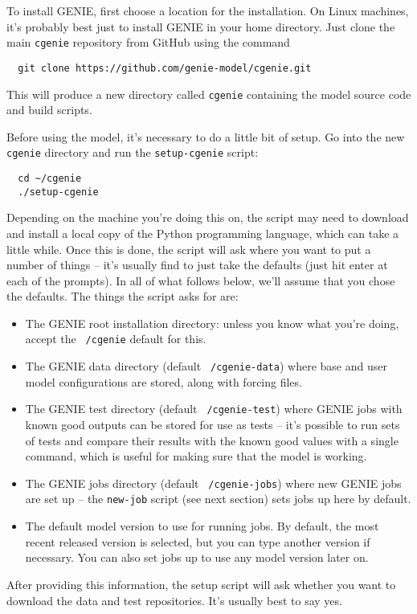 \documentclass[a4paper,10pt,article]{memoir}
\begin{document}
To install GENIE, first choose a location for the installation.  On
Linux machines, it's probably best just to install GENIE in your home
directory.  Just clone the main \texttt{cgenie} repository from GitHub
using the command
\begin{verbatim}
  git clone https://github.com/genie-model/cgenie.git
\end{verbatim}
This will produce a new directory called \texttt{cgenie} containing
the model source code and build scripts.

Before using the model, it's necessary to do a little bit of setup.
Go into the new \texttt{cgenie} directory and run the
\texttt{setup-cgenie} script:
\begin{verbatim}
  cd ~/cgenie
  ./setup-cgenie
\end{verbatim}
Depending on the machine you're doing this on, the script may need to
download and install a local copy of the Python programming language,
which can take a little while.  Once this is done, the script will ask
where you want to put a number of things -- it's usually find to just
take the defaults (just hit enter at each of the prompts).  In all of
what follows below, we'll assume that you chose the defaults.  The
things the script asks for are:
\begin{itemize}
  \item{The GENIE root installation directory: unless you know what
    you're doing, accept the \texttt{~/cgenie} default for this.}
  \item{The GENIE data directory (default \texttt{~/cgenie-data})
    where base and user model configurations are stored, along with
    forcing files.}
  \item{The GENIE test directory (default \texttt{~/cgenie-test})
    where GENIE jobs with known good outputs can be stored for use as
    tests -- it's possible to run sets of tests and compare their
    results with the known good values with a single command, which is
    useful for making sure that the model is working.}
  \item{The GENIE jobs directory (default \texttt{~/cgenie-jobs})
    where new GENIE jobs are set up -- the \texttt{new-job} script
    (see next section) sets jobs up here by default.}
  \item{The default model version to use for running jobs.  By
    default, the most recent released version is selected, but you can
    type another version if necessary.  You can also set jobs up to
    use any model version later on.}
\end{itemize}
After providing this information, the setup script will ask whether
you want to download the data and test repositories.  It's usually
best to say yes.
\end{document}
